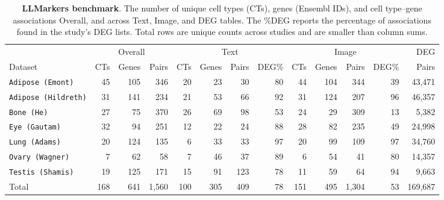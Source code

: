 \documentclass[10pt,twocolumn]{article}
\theoremstyle{plain}
\theoremstyle{definition}
\theoremstyle{remark}
\begin{document}
\begin{table}[ht!]
  \centering
  \caption{\textbf{LLMarkers benchmark}. The number of unique cell types (CTs), genes (Ensembl IDs), and cell type--gene associations Overall, and across Text, Image, and DEG tables. The \%DEG reports the percentage of associations found in the study's DEG lists. Total rows are unique counts across studies and are smaller than column sums.}
  \label{tab:benchmark}%
  \small
  \begin{tabular}{@{}l rrr rrrr rrrr r@{}}
  \toprule
   & \multicolumn{3}{c}{Overall} & \multicolumn{4}{c}{Text} & \multicolumn{4}{c}{Image} & DEG \\
  \cmidrule(lr){2-4} \cmidrule(lr){5-8} \cmidrule(lr){9-12} \cmidrule(lr){13-13}
  Dataset & CTs & Genes & Pairs & CTs & Genes & Pairs & DEG\% & CTs & Genes & Pairs & DEG\% & Pairs \\
  \midrule
  \texttt{Adipose (Emont)}    &  45 & 105 &   346 &  20 &  23 &   30 &  80 &  44 & 104 &  344 &  39 & 43{,}471 \\
  \texttt{Adipose (Hildreth)} &  31 & 141 &   234 &  21 &  53 &   66 &  92 &  31 & 124 &  207 &  96 & 46{,}357 \\
  \texttt{Bone (He)}          &  27 &  75 &   370 &  26 &  69 &   98 &  53 &  24 &  29 &  309 &  13 &  5{,}382 \\
  \texttt{Eye (Gautam)}       &  32 &  94 &   251 &  12 &  22 &   24 &  88 &  28 &  82 &  235 &  49 & 24{,}998 \\
  \texttt{Lung (Adams)}       &  20 & 124 &   135 &   6 &  33 &   33 &  97 &  20 &  99 &  109 &  97 & 34{,}760 \\
  \texttt{Ovary (Wagner)}     &   7 &  62 &    58 &   7 &  46 &   37 &  89 &   6 &  54 &   41 &  80 & 14{,}357 \\
  \texttt{Testis (Shamis)}    &  19 & 125 &   171 &  15 &  91 &  123 &  78 &  11 &  59 &   64 &  94 &  9{,}663 \\
  \midrule
  Total              & 168 & 641 & 1{,}560 & 100 & 305 &  409 &  78 & 151 & 495 & 1{,}304 &  53 & 169{,}687 \\
  \bottomrule
  \end{tabular}
\end{table}


\end{document}
